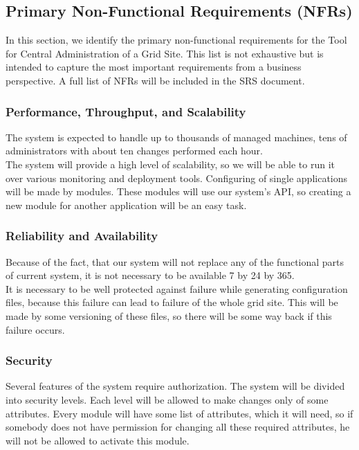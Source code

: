 \documentclass[12pt]{article}
\begin{document}
\subsection{Primary Non-Functional Requirements (NFRs)}
In this section, we identify the primary non-functional requirements for the Tool for Central Administration of a Grid Site. This 
list is not exhaustive but is intended to capture the most important requirements from a business perspective. A full list of NFRs 
will be included in the SRS document.

\subsubsection{Performance, Throughput, and Scalability}
The system is expected to handle up to thousands of managed machines, tens of administrators with about ten changes performed each hour.\\
The system will provide a high level of scalability, so we will be able to run it over various monitoring and deployment tools. 
Configuring of single applications will be made by modules. These modules will use our system's API, so creating a new module for 
another application will be an easy task.

\subsubsection{Reliability and Availability}
Because of the fact, that our system will not replace any of the functional parts of current system, it is not necessary to be 
available 7 by 24 by 365.\\
It is necessary to be well protected against failure while generating configuration files, because this failure can lead to failure 
of the whole grid site. This will be made by some versioning of these files, so there will be some way back if this failure occurs.

\subsubsection{Security}
Several features of the system require authorization. The system will be divided into security levels. Each level will be allowed 
to make changes only of some attributes. Every module will have some list of attributes, which it will need, so if somebody 
does not have permission for changing all these required attributes, he will not be allowed to activate this module.
\end{document}
